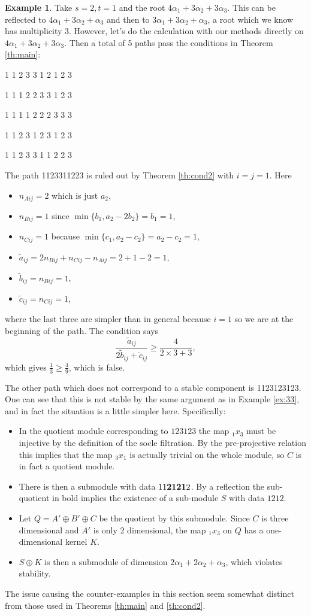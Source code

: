 \documentclass{amsart}
\numberwithin{equation}{section}
\numberwithin{figure}{section}
\numberwithin{table}{section}
\theoremstyle{definition}
\newtheorem{Example}[equation]{Example}
\begin{document}
\begin{Example}\label{ex:clean-nonminimal} Take $s=2, t=1$ and
the root $4\alpha_1+3 \alpha_2 +3 \alpha_3$. This can be reflected to  $4\alpha_1+3 \alpha_2+  \alpha_3$ and then to  $3\alpha_1+3 \alpha_2 + \alpha_3$, a root which we know has multiplicity 3. However, let's do the calculation with our methods directly on $4\alpha_1+3 \alpha_2 +3 \alpha_3$. Then a total of 5 paths pass the conditions in Theorem \ref{th:main}:

1 1 2 3 3 1 2 1 2 3


1 1 1 2 2 3 3 1 2 3

1 1 1 1 2 2 2 3 3 3

{\color{red} 1 1 2 3 1 2 3 1 2 3}

{\color{blue} 1 1 2 3 3 1 1 2 2 3}

\noindent The path 1123311223 is ruled out by Theorem \ref{th:cond2} with $i=j=1$. Here 
\begin{itemize}
	\item $n_{Aij}=2$ which is just $a_2$,
	\item $n_{Bij}=1$ since $\min \{ b_1, a_2-2b_2 \} = b_1=1$, 
	\item  $n_{Cij}= 1$ because $\min \{ c_1, a_2-c_2 \} = a_2-c_2=1,$ 
	\item $\tilde a_{ij}= 2 n_{Bij}+ n_{Cij}- n_{Aij}= 2+1-2=1,$
	\item $\tilde b_{ij}= n_{Bij}=1$,
	\item $\tilde c_{ij}= n_{Cij}=1$,
\end{itemize}
where the last three are simpler than in general because $i=1$ so we are at the beginning of the path.
The condition says 
$$\frac{\tilde a_{ij}}{2\tilde b_{ij}+\tilde c_{ij}} \geq \frac{4}{2\times 3+3},$$
which gives $\frac{1}{3} \geq \frac{4}{9}$, which is false. 

The other path which does not correspond to a stable component is 1123123123.
One can see that this is not stable by the same argument as in Example \ref{ex:33}, and in fact the situation is a little simpler here. Specifically:
\begin{itemize}
	\item In the quotient module corresponding to $123123$ the map ${}_1x_{3}$ must be injective by the definition of the socle filtration. By the pre-projective relation this implies that the map ${}_3x_1$ is actually trivial on the whole module, so $C$ is in fact a quotient module. 
	\item There is then a submodule with data $11{\bf 2121}2$. By a reflection the sub-quotient in bold implies the existence of a sub-module $S$ with data $1212$. 
	\item Let $Q= A' \oplus B' \oplus C$
	be the quotient by this submodule. Since $C$ is three dimensional and $A'$ is only 2 dimensional, the map ${}_1 x_3$ on $Q$ has a one-dimensional kernel $K$.
	\item $S \oplus K$ is then a submodule of dimension $2 \alpha_1+2\alpha_2+\alpha_3$, which violates stability. 
\end{itemize} 
The issue causing the counter-examples in this section seem somewhat distinct from those used in Theorems \ref{th:main} and \ref{th:cond2}.
\end{Example}
\end{document}
